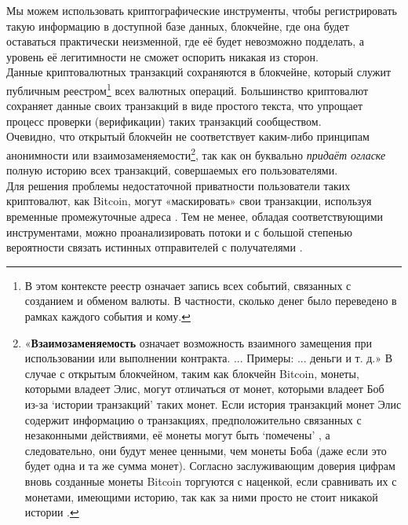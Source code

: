 Мы можем использовать криптографические инструменты, чтобы регистрировать такую ин\-формацию в доступной базе данных, блокчейне, где она будет оставаться практически неиз\-менной, где её будет невозможно подделать, а уровень её легитимности не сможет оспорить никакая из сторон.
\\ \newline
Данные криптовалютных транзакций сохраняются в блокчейне, который служит публичным реестром\footnote{В этом контексте реестр означает запись всех событий, связанных с созданием и обменом валюты. В частности, сколько денег было переведено в рамках каждого события и кому.} всех валютных операций. Большинство криптовалют сохраняет данные своих транзакций в виде простого текста, что упрощает процесс проверки (верификации) таких транзакций сообществом.
\\ \newline
Очевидно, что открытый блокчейн не соответствует каким-либо принципам анонимности или взаимозаменяемости\footnote{«\textbf{Взаимозаменяемость} означает возможность взаимного замещения при использовании или выполнении контракта. ... Примеры: ... деньги и т. д.»\cite{mises-org-fungible} В случае с открытым блокчейном, таким как блокчейн Bitcoin, монеты, которыми владеет Элис, могут отличаться от монет, которыми владеет Боб из-за `истории транзакций' таких монет. Если история транзакций монет Элис содержит информацию о транзакциях, предположительно связанных с незаконными действиями, её монеты могут быть `помечены' \cite{bitcoin-big-bang-taint}, а следовательно, они будут менее ценными, чем монеты Боба (даже если это будет одна и та же сумма монет). Согласно заслуживающим доверия цифрам вновь созданные монеты Bitcoin торгуются с наценкой, если сравнивать их с монетами, имеющими историю, так как за ними просто не стоит никакой истории \cite{new-bitcoin-premium}.}, так как он буквально {\em придаёт огласке} полную историю всех транзак\-ций, совершаемых его пользователями.
\\ \newline
Для решения проблемы недостаточной приватности пользователи таких криптовалют, как Bitcoin, могут «маскировать» свои транзакции, используя временные промежуточные адреса \cite{DBLP:journals/corr/NarayananM17}. Тем не менее, обладая соответствующими инструментами, можно проанализировать потоки и с большой степенью вероятности связать истинных отправителей с получателями \cite{DBLP:journals/corr/ShenTuY15b, DK-police-tracing-btc, Andrew-Cox-Sandia, chainalysis-2020-report}.

